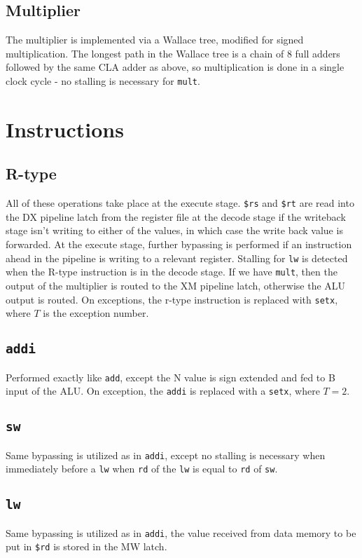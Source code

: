 \documentclass[letterpaper]{article} %
\begin{document}
\subsection*{Multiplier}
The multiplier is implemented via a Wallace tree, modified for signed multiplication. The longest path in the Wallace tree is a chain of 8 full adders followed by the same CLA adder as above, so multiplication is done in a single clock cycle - no stalling is necessary for \texttt{mult}.

\section*{Instructions}
\subsection*{R-type}
All of these operations take place at the execute stage. \texttt{\$rs} and \texttt{\$rt} are read into the DX pipeline latch from the register file at the decode stage if the writeback stage isn't writing to either of the values, in which case the write back value is forwarded. At the execute stage, further bypassing is performed if an instruction ahead in the pipeline is writing to a relevant register. Stalling for \texttt{lw} is detected when the R-type instruction is in the decode stage. If we have \texttt{mult}, then the output of the multiplier is routed to the XM pipeline latch, otherwise the ALU output is routed. On exceptions, the r-type instruction is replaced with \texttt{setx}, where $T$ is the exception number.

\subsection*{\texttt{addi}}
Performed exactly like \texttt{add}, except the N value is sign extended and fed to B input of the ALU. On exception, the \texttt{addi} is replaced with a \texttt{setx}, where $T=2$.

\subsection*{\texttt{sw}}
Same bypassing is utilized as in \texttt{addi}, except no stalling is necessary when immediately before a \texttt{lw} when \texttt{rd} of the \texttt{lw} is equal to \texttt{rd} of \texttt{sw}.
\subsection*{\texttt{lw}}
Same bypassing is utilized as in \texttt{addi}, the value received from data memory to be put in \texttt{\$rd} is stored in the MW latch.
\end{document}
